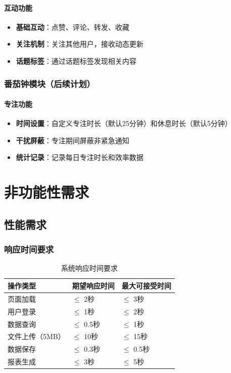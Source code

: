 \documentclass[a4paper]{article}
\begin{document}
\paragraph{互动功能}
\begin{itemize}
    \item \textbf{基础互动}：点赞、评论、转发、收藏
    \item \textbf{关注机制}：关注其他用户，接收动态更新
    \item \textbf{话题标签}：通过话题标签发现相关内容
\end{itemize}

\subsubsection{番茄钟模块（后续计划）}

\paragraph{专注功能}
\begin{itemize}
    \item \textbf{时间设置}：自定义专注时长（默认25分钟）和休息时长（默认5分钟）
    \item \textbf{干扰屏蔽}：专注期间屏蔽非紧急通知
    \item \textbf{统计记录}：记录每日专注时长和效率数据
\end{itemize}

\section{非功能性需求}

\subsection{性能需求}

\subsubsection{响应时间要求}

\begin{table}[H]
\centering
\begin{tabular}{|l|l|l|}
\hline
\textbf{操作类型} & \textbf{期望响应时间} & \textbf{最大可接受时间} \\
\hline
页面加载 & $\leq$ 2秒 & $\leq$ 3秒 \\
\hline
用户登录 & $\leq$ 1秒 & $\leq$ 2秒 \\
\hline
数据查询 & $\leq$ 0.5秒 & $\leq$ 1秒 \\
\hline
文件上传（5MB） & $\leq$ 10秒 & $\leq$ 15秒 \\
\hline
数据保存 & $\leq$ 0.3秒 & $\leq$ 0.5秒 \\
\hline
报表生成 & $\leq$ 3秒 & $\leq$ 5秒 \\
\hline
\end{tabular}
\caption{系统响应时间要求}
\end{table}
\end{document}
